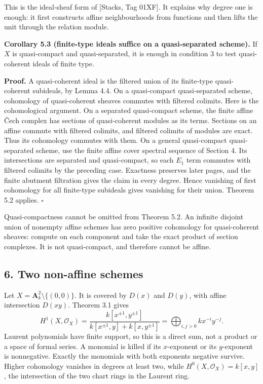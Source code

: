 \documentclass[11pt]{article}
\begin{document}
This is the ideal-sheaf form of {[}Stacks, Tag 01XF{]}. It explains why
degree one is enough: it first constructs affine neighbourhoods from
functions and then lifts the unit through the relation module.

\textbf{Corollary 5.3 (finite-type ideals suffice on a quasi-separated
scheme).} If \(X\) is quasi-compact and quasi-separated, it is enough in
condition 3 to test quasi-coherent ideals of finite type.

\textbf{Proof.} A quasi-coherent ideal is the filtered union of its
finite-type quasi-coherent subideals, by Lemma 4.4. On a quasi-compact
quasi-separated scheme, cohomology of quasi-coherent sheaves commutes
with filtered colimits. Here is the cohomological argument. On a
separated quasi-compact scheme, the finite affine Čech complex has
sections of quasi-coherent modules as its terms. Sections on an affine
commute with filtered colimits, and filtered colimits of modules are
exact. Thus its cohomology commutes with them. On a general
quasi-compact quasi-separated scheme, use the finite affine cover
spectral sequence of Section 4. Its intersections are separated and
quasi-compact, so each \(E_1\) term commutes with filtered colimits by
the preceding case. Exactness preserves later pages, and the finite
abutment filtration gives the claim in every degree. Hence vanishing of
first cohomology for all finite-type subideals gives vanishing for their
union. Theorem 5.2 applies. \(\square\)

Quasi-compactness cannot be omitted from Theorem 5.2. An infinite
disjoint union of nonempty affine schemes has zero positive cohomology
for quasi-coherent sheaves: compute on each component and take the exact
product of section complexes. It is not quasi-compact, and therefore
cannot be affine.

\subsection{6. Two non-affine schemes}\label{two-non-affine-schemes}

Let \(X=\mathbf A_k^2\setminus\{(0,0)\}\). It is covered by \(D(x)\) and
\(D(y)\), with affine intersection \(D(xy)\). Theorem 3.1 gives \[
H^1(X,\mathcal O_X)
=\frac{k[x^{\pm1},y^{\pm1}]}{k[x^{\pm1},y]+k[x,y^{\pm1}]}
=\bigoplus_{i,j>0}k x^{-i}y^{-j}.
\] Laurent polynomials have finite support, so this is a direct sum, not
a product or a space of formal series. A monomial is killed if its
\(x\)-exponent or its \(y\)-exponent is nonnegative. Exactly the
monomials with both exponents negative survive. Higher cohomology
vanishes in degrees at least two, while \(H^0(X,\mathcal O_X)=k[x,y]\),
the intersection of the two chart rings in the Laurent ring.
\end{document}
